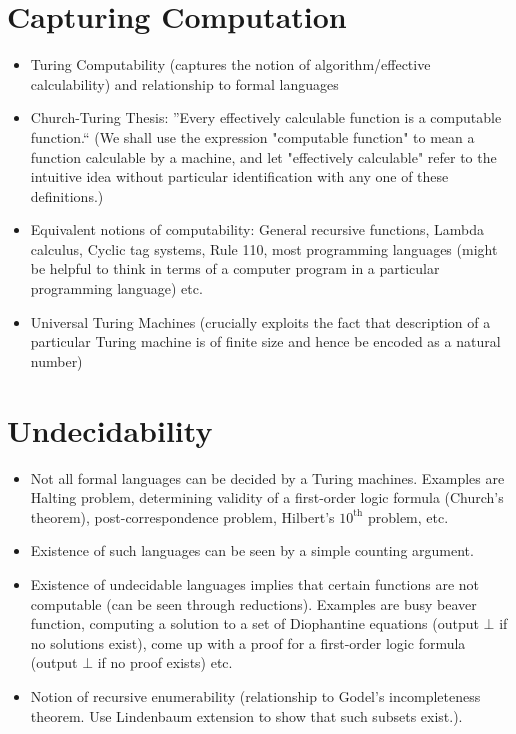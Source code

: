 \documentclass[
11pt,notheorems,hyperref={pdfauthor=whatever}
]{beamer}
\begin{document}
\section{Capturing Computation}
\begin{frame}
\begin{itemize}
    \item Turing Computability (captures the notion of algorithm/effective calculability) and relationship to formal languages
    \item Church-Turing Thesis: ''Every effectively calculable function is a computable function.`` (We shall use the expression "computable function" to mean a function calculable by a machine, and let "effectively calculable" refer to the intuitive idea without particular identification with any one of these definitions.) \cite{turing1938systems}
    \item Equivalent notions of computability: General recursive functions, Lambda calculus, Cyclic tag systems, Rule 110, most programming languages (might be helpful to think in terms of a computer program in a particular programming language) etc.
    \item Universal Turing Machines (crucially exploits the fact that description of a particular Turing machine is of finite size and hence be encoded as a natural number)
\end{itemize}     
\end{frame}

\section{Undecidability}
\begin{frame}
\begin{itemize}
    \item Not all formal languages can be decided by a Turing machines. Examples are Halting problem, determining validity of a first-order logic formula (Church's theorem), post-correspondence problem, Hilbert's $10^{\text{th}}$ problem, etc.
    \item Existence of such languages can be seen by a simple counting argument.
    \item Existence of undecidable languages implies that certain functions are not computable (can be seen through reductions). Examples are busy beaver function, computing a solution to a set of Diophantine equations (output $\bot$ if no solutions exist), come up with a proof for a first-order logic formula (output $\bot$ if no proof exists) etc.
    \item Notion of recursive enumerability (relationship to Godel's incompleteness theorem. Use Lindenbaum extension to show that such subsets exist.).
\end{itemize}     
\end{frame}
\end{document}
